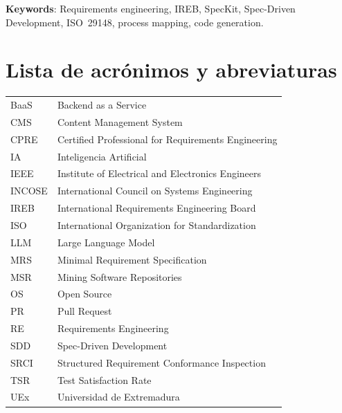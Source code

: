 \documentclass[minitoc, hidelinks, headlogo, framedcover]{tfeEPCC}
\begin{document}
\noindent\textbf{Keywords}: Requirements engineering, IREB, SpecKit, Spec-Driven Development, ISO~29148, process mapping, code generation.

\newpage
\pagestyle{plain}
\setcounter{page}{1}
\tableofcontents
\newpage
\listoftables
\newpage
\listoffigures
\newpage

\chapter*{Lista de acr\'onimos y abreviaturas}

\begin{tabular}{ll}
BaaS & Backend as a Service \\
CMS & Content Management System \\
CPRE & Certified Professional for Requirements Engineering \\
IA & Inteligencia Artificial \\
IEEE & Institute of Electrical and Electronics Engineers \\
INCOSE & International Council on Systems Engineering \\
IREB & International Requirements Engineering Board \\
ISO & International Organization for Standardization \\
LLM & Large Language Model \\
MRS & Minimal Requirement Specification \\
MSR & Mining Software Repositories \\
OS & Open Source \\
PR & Pull Request \\
RE & Requirements Engineering \\
SDD & Spec-Driven Development \\
SRCI & Structured Requirement Conformance Inspection \\
TSR & Test Satisfaction Rate \\
UEx & Universidad de Extremadura \\
\end{tabular}

\newpage
\end{document}

